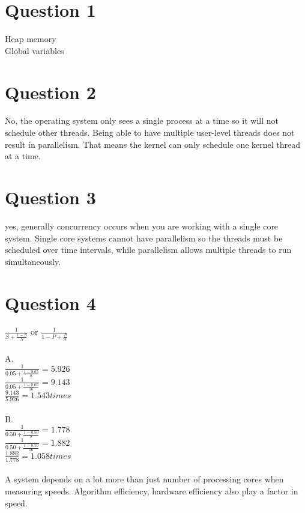 \documentclass[11pt]{article}
\begin{document}
\maketitle

\section*{Question 1}
Heap memory\\
Global variables

\section*{Question 2}
No, the operating system only sees a single process at
a time so it will not schedule other threads. Being able 
to have multiple user-level threads does not result in 
parallelism. That means the kernel can only schedule 
one kernel thread at a time. 

\section*{Question 3}
yes, generally concurrency occurs when you 
are working with a single core system.
Single core systems cannot have parallelism so the threads 
must be scheduled over time intervals, while parallelism allows
multiple threads to run simultaneously.

\newpage
\section*{Question 4}
$\frac{1}{S + \frac{1-S}{N}}$
or
$\frac{1}{1 - P + \frac{P}{N}}$\\\\
A.\\
$\frac{1}{0.05 + \frac{1-0.05}{8}} = 5.926$\\
$\frac{1}{0.05 + \frac{1-0.05}{16}} = 9.143$\\
$\frac{9.143}{5.926} = 1.543times$\\\\
B.\\
$\frac{1}{0.50 + \frac{1-0.50}{8}} = 1.778$\\
$\frac{1}{0.50 + \frac{1-0.50}{16}} = 1.882$\\
$\frac{1.882}{1.778} = 1.058times$\\\\
A system depends on a lot more than just number of 
processing cores when measuring speeds. Algorithm efficiency,
hardware efficiency also play a factor in speed.
\end{document}
